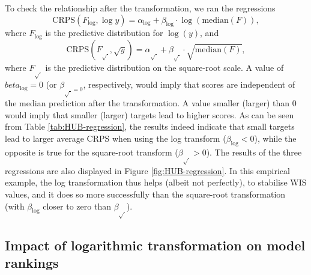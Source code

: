 \documentclass{article}
\begin{document}
To check the relationship after the transformation, we ran the regressions
\begin{equation*}
    \text{CRPS}(F_{\log}, \log y) = \alpha_{\log} + \beta_{\log} \cdot \log{(\text{median}(F))},
\end{equation*}
where $F_{\log}$ is the predictive distribution for $\log(y)$, and
\begin{equation*}
    \text{CRPS}(F_{\sqrt{\ }}, \sqrt{y}) = \alpha_{\sqrt{\ }} + \beta_{\sqrt{\ }} \cdot \sqrt{\text{median}(F)},
\end{equation*} 
where $F_{\sqrt{\ }}$ is the predictive distribution on the square-root scale. A value of $beta_{\log} = 0$ (or $\beta_{\sqrt{\ } = 0}$, respectively, would imply that scores are independent of the median prediction after the transformation. A value smaller (larger) than 0 would imply that smaller (larger) targets lead to higher scores. As can be seen from Table \ref{tab:HUB-regression}, the results indeed indicate that small targets lead to larger average CRPS when using the log transform ($\beta_{\log} < 0$), while the opposite is true for the square-root transform ($\beta_{\sqrt{\ }} > 0$). The results of the three regressions are also displayed in Figure \ref{fig:HUB-regression}. In this empirical example, the log transformation thus helps (albeit not perfectly), to stabilise WIS values, and it does so more successfully than the square-root transformation (with $\beta_{\log}$ closer to zero than $\beta_{\sqrt{\ }}$).  

\subsection{Impact of logarithmic transformation on model rankings}
\end{document}
